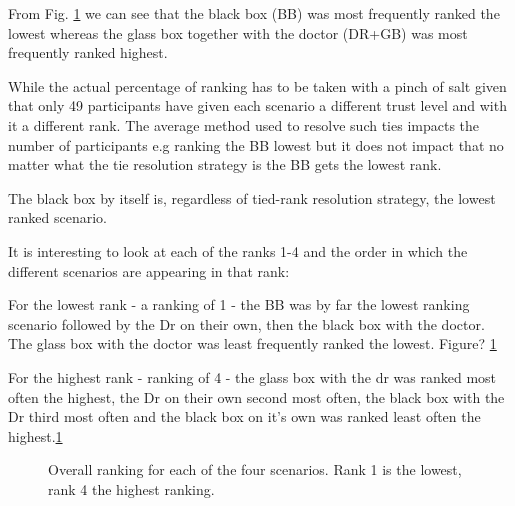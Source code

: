 \documentclass[manuscript,screen,review]{acmart}
\begin{document}


From Fig. \ref{fig:overall-ranking} we can see that the black box (BB) was most frequently ranked the lowest whereas the glass box together with the doctor (DR+GB) was most frequently ranked highest.

While the actual percentage of ranking has to be taken with a pinch of salt given that only 49 participants have given each scenario a different trust level and with it a different rank. The average method used to resolve such ties impacts the number of participants e.g ranking the BB lowest but it does not impact that no matter what the tie resolution strategy is the BB gets the lowest rank.

The black box by itself is, regardless of tied-rank resolution strategy, the lowest ranked scenario.

It is interesting to look at each of the ranks 1-4 and the order in which the different scenarios are appearing in that rank:

For the lowest rank - a ranking of 1 - the BB was by far the lowest ranking scenario followed by the Dr on their own, then the black box with the doctor. The glass box with the doctor was  least frequently ranked the lowest. Figure? \ref{fig:overall-ranking}

For the highest rank - ranking of 4 - the glass box with the dr was ranked most often the highest, the Dr on their own second most often, the black box with the Dr third most often and the black box on it's own was ranked least often the highest.\ref{fig:overall-ranking}

\begin{figure}[H]
    \caption{Overall ranking for each of the four scenarios. Rank 1 is the lowest, rank 4 the highest ranking.}
    \label{fig:overall-ranking}
\end{figure}
\end{document}
